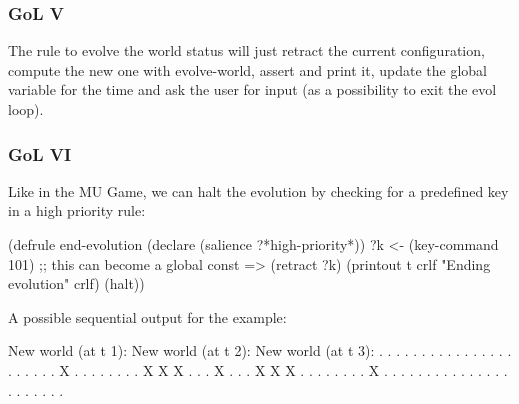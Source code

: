 \documentclass[xcolor={usenames,dvipsnames,svgnames}, compress]{beamer}
\begin{document}
\begin{frame}[fragile]
  \frametitle{GoL V}
  The rule to evolve the world status will just retract the current
  configuration, compute the new one with \textsf{evolve-world},
  assert and print it, update the global variable for the time and
  ask the user for input (as a possibility to exit the evol loop).
  
\end{frame}

\begin{frame}[fragile]
  \frametitle{GoL VI}
  Like in the MU Game, we can halt the evolution by checking for a
  predefined key in a high priority rule:
  \begin{clips-code}[numbers=none]
    (defrule end-evolution
        (declare (salience ?*high-priority*))
        ?k <- (key-command 101) ;; this can become a global const
        =>
        (retract ?k)
        (printout t crlf "Ending evolution" crlf)
        (halt))
      \end{clips-code}
      
 A possible sequential output for the example:
 \begin{clips-code}[numbers=none]
    New world (at t 1):    New world (at t 2):   New world (at t 3):       
    .  .  .  .  .          .  .  .  .  .         .  .  .  .  .         
    .  .  .  .  .          .  .  X  .  .         .  .  .  .  .         
    .  X  X  X  .          .  .  X  .  .         .  X  X  X  .         
    .  .  .  .  .          .  .  X  .  .         .  .  .  .  .         
    .  .  .  .  .          .  .  .  .  .         .  .  .  .  .         
  \end{clips-code}
      
\end{frame}
\end{document}
